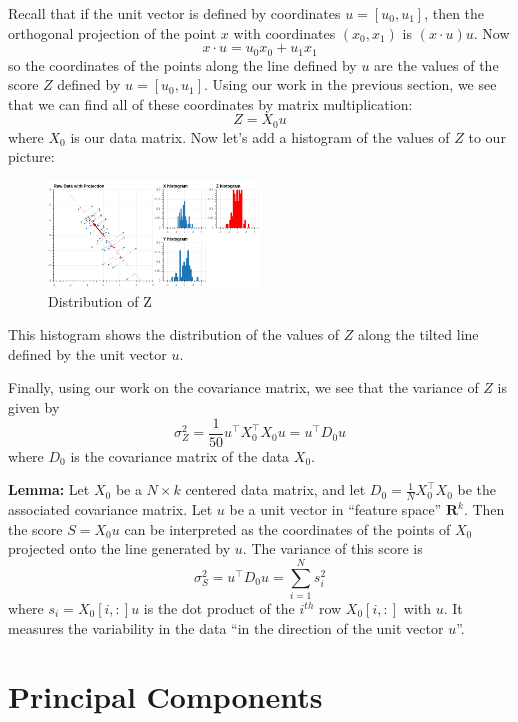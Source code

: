 \documentclass[
  oneside]{scrbook}
\begin{document}
Recall that if the unit vector is defined by coordinates
\(u=[u_0,u_1]\), then the orthogonal projection of the point \(x\) with
coordinates \((x_0,x_1)\) is \((x\cdot u)u\). Now \[
x\cdot u = u_0 x_0 + u_1 x_1
\] so the coordinates of the points along the line defined by \(u\) are
the values of the score \(Z\) defined by \(u=[u_0,u_1]\). Using our work
in the previous section, we see that we can find all of these
coordinates by matrix multiplication: \[
Z = X_0 u
\] where \(X_0\) is our data matrix. Now let's add a histogram of the
values of \(Z\) to our picture:

\begin{figure}
\hypertarget{fig:pcasimfig-3}{%
\centering
\includegraphics[width=0.5\textwidth,height=\textheight]{img/PCAsimulated-4.png}
\caption{Distribution of Z}\label{fig:pcasimfig-3}
}
\end{figure}

This histogram shows the distribution of the values of \(Z\) along the
tilted line defined by the unit vector \(u\).

Finally, using our work on the covariance matrix, we see that the
variance of \(Z\) is given by \[
\sigma_{Z}^2 = \frac{1}{50}u^{\intercal}X_{0}^{\intercal}X_{0}u = u^{\intercal}D_{0}u
\] where \(D_{0}\) is the covariance matrix of the data \(X_{0}\).

\textbf{Lemma:} Let \(X_{0}\) be a \(N\times k\) centered data matrix,
and let \(D_{0}=\frac{1}{N}X_{0}^{\intercal}X_{0}\) be the associated
covariance matrix. Let \(u\) be a unit vector in ``feature space''
\(\mathbf{R}^{k}\). Then the score \(S=X_{0}u\) can be interpreted as
the coordinates of the points of \(X_{0}\) projected onto the line
generated by \(u\). The variance of this score is \[
\sigma^{2}_{S} = u^{\intercal}D_{0}u = \sum_{i=1}^{N} s_{i}^2
\] where \(s_{i} = X_{0}[i,:]u\) is the dot product of the \(i^{th}\)
row \(X_{0}[i,:]\) with \(u\). It measures the variability in the data
``in the direction of the unit vector \(u\)''.

\hypertarget{principal-components}{%
\section{Principal Components}\label{principal-components}}
\end{document}
